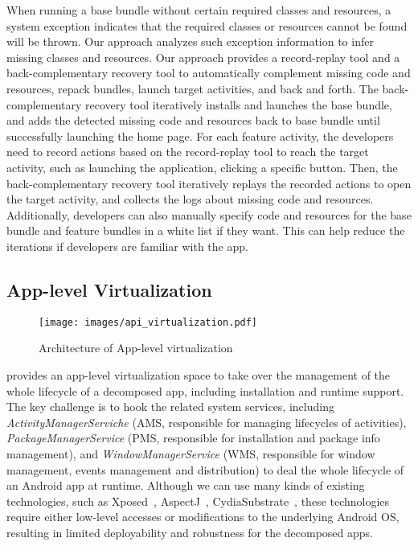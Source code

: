 When running a base bundle without certain required classes and resources, a system exception indicates that the required classes or resources cannot be found will be thrown.
Our approach analyzes such exception information to infer missing classes and resources. 
Our approach provides a record-replay tool and a back-complementary recovery tool to automatically complement missing code and resources, repack bundles, launch target activities, and back and forth. 
The back-complementary recovery tool iteratively installs and launches the base bundle, and adds the detected missing code and resources back to base bundle until successfully launching the home page. 
For each feature activity, the developers need to record actions based on the record-replay tool to reach the target activity, such as launching the application, clicking a specific button. 
Then, the back-complementary recovery tool iteratively replays the recorded actions to open the target activity, and collects the logs about missing code and resources. 
Additionally, developers can also manually specify code and resources for the base bundle and feature bundles in a white list if they want. 
This can help reduce the iterations if developers are familiar with the app.


\subsection{App-level Virtualization}

\begin{figure}[!t]
	\centering
    \texttt{[image: images/api\_virtualization.pdf]}
    \caption{Architecture of App-level virtualization} 
    \label{fig:app_level_virtualization}
\end{figure}
\nickName{} provides an app-level virtualization space to take over the management of the whole lifecycle of a decomposed app, including installation and runtime support. The key challenge is to hook the related system services, including \textit{ActivityManagerServiche} (AMS, responsible for managing lifecycles of activities), \textit{PackageManagerService} (PMS, responsible for installation and package info management), and \textit{WindowManagerService} (WMS, responsible for window management, events management and distribution) to deal the whole lifecycle of an Android app at runtime. Although we can use many kinds of existing technologies, such as Xposed~\cite{xposed}, AspectJ~\cite{MP2009Laddad}, CydiaSubstrate~\cite{CydiaSubstrate}, these technologies require either low-level accesses or modifications to the underlying Android OS, resulting in limited deployability and robustness for the decomposed apps.

